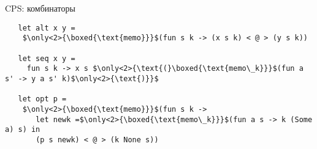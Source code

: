 \documentclass[10pt, mathserif]{beamer}
\theoremstyle{definition}
\begin{document}
\begin{frame}[fragile]{CPS: комбинаторы}

  \begin{lstlisting}
   let alt x y =
    $\only<2>{\boxed{\text{memo}}}$(fun s k -> (x s k) < @ > (y s k))

   let seq x y =
     fun s k -> x s $\only<2>{\text{(}\boxed{\text{memo\_k}}}$(fun a s' -> y a s' k)$\only<2>{\text{)}}$

   let opt p =
    $\only<2>{\boxed{\text{memo}}}$(fun s k ->
       let newk =$\only<2>{\boxed{\text{memo\_k}}}$(fun a s -> k (Some a) s) in
       (p s newk) < @ > (k None s))

  \end{lstlisting}

\end{frame}
%
%
%

%
%
%
%
%
%
%
%
%
%
%
\end{document}
